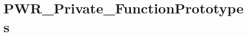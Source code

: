 \hypertarget{group___p_w_r___private___function_prototypes}{\section{P\-W\-R\-\_\-\-Private\-\_\-\-Function\-Prototypes}
\label{group___p_w_r___private___function_prototypes}
}

